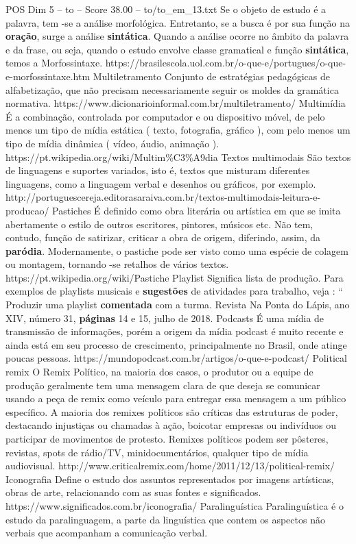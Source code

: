 \begin{textsample}{POS Dim 5 – to – Score 38.00 – to/to\_em\_13.txt}
Se o objeto de estudo é a palavra, tem -se a análise morfológica.
Entretanto, se a busca é por sua função na \textbf{oração}, surge a análise \textbf{sintática}.
Quando a análise ocorre no âmbito da palavra e da frase, ou seja, quando o estudo envolve classe gramatical e função \textbf{sintática}, temos a Morfossintaxe. https://brasilescola.uol.com.br/o-que-e/portugues/o-que-e-morfossintaxe.htm Multiletramento Conjunto de estratégias pedagógicas de alfabetização, que não precisam necessariamente seguir os moldes da gramática normativa. https://www.dicionarioinformal.com.br/multiletramento/ Multimídia É a combinação, controlada por computador e ou dispositivo móvel, de pelo menos um tipo de mídia estática ( texto, fotografia, gráfico ), com pelo menos um tipo de mídia dinâmica ( vídeo, áudio, animação ). https://pt.wikipedia.org/wiki/Multim\%C3\%A9dia Textos multimodais São textos de linguagens e suportes variados, isto é, textos que misturam diferentes linguagens, como a linguagem verbal e desenhos ou gráficos, por exemplo. http://portuguescereja.editorasaraiva.com.br/textos-multimodais-leitura-e-producao/ Pastiches É definido como obra literária ou artística em que se imita abertamente o estilo de outros escritores, pintores, músicos etc.
Não tem, contudo, função de satirizar, criticar a obra de origem, diferindo, assim, da \textbf{paródia}.
Modernamente, o pastiche pode ser visto como uma espécie de colagem ou montagem, tornando -se retalhos de vários textos. https://pt.wikipedia.org/wiki/Pastiche Playlist Significa lista de produção.
Para exemplos de playlists musicais e \textbf{sugestões} de atividades para trabalho, veja : “ Produzir uma playlist \textbf{comentada} com a turma.
Revista Na Ponta do Lápis, ano XIV, número 31, \textbf{páginas} 14 e 15, julho de 2018.
Podcasts É uma mídia de transmissão de informações, porém a origem da mídia podcast é muito recente e ainda está em seu processo de crescimento, principalmente no Brasil, onde atinge poucas pessoas. https://mundopodcast.com.br/artigos/o-que-e-podcast/ Political remix O Remix Político, na maioria dos casos, o produtor ou a equipe de produção geralmente tem uma mensagem clara de que deseja se comunicar usando a peça de remix como veículo para entregar essa mensagem a um público específico.
A maioria dos remixes políticos são críticas das estruturas de poder, destacando injustiças ou chamadas à ação, boicotar empresas ou indivíduos ou participar de movimentos de protesto.
Remixes políticos podem ser pôsteres, revistas, spots de rádio/TV, minidocumentários, qualquer tipo de mídia audiovisual. http://www.criticalremix.com/home/2011/12/13/political-remix/ Iconografia Define o estudo dos assuntos representados por imagens artísticas, obras de arte, relacionando com as suas fontes e significados. https://www.significados.com.br/iconografia/ Paralinguística Paralinguística é o estudo da paralinguagem, a parte da linguística que contem os aspectos não verbais que acompanham a comunicação verbal.

\end{textsample}
